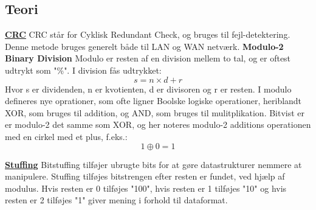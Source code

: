 \subsection{Teori}
\underline{\textbf{CRC}}
\newline
CRC står for Cyklisk Redundant Check, og bruges til fejl-detektering. Denne metode bruges generelt både til LAN og WAN netværk.
\newline
\textbf{Modulo-2 Binary Division}
\newline
Modulo er resten af en division mellem to tal, og er oftest udtrykt som "\%".
\newline
I division fås udtrykket:
$$s = n \times d + r$$
\newline
Hvor s er dividenden, n er kvotienten, d er divisoren og r er resten.
\newline
I modulo defineres nye oprationer, som ofte ligner Boolske logiske operationer, heriblandt XOR, som bruges til addition, og AND, som bruges til mulitplikation.
Bitvist er er modulo-2 det samme som XOR, og her noteres modulo-2 additions operationen med en cirkel med et plus, f.eks.: 
$$1 \oplus 0 = 1$$

\newline
\hfill \break
\underline{\textbf{Stuffing}}
\newline
Bitstuffing tilføjer ubrugte bits for at gøre datastrukturer nemmere at manipulere.
\newline
Stuffing tilføjes bitstrengen efter resten er fundet, ved hjælp af modulus. Hvis resten er 0 tilføjes "100", hvis resten er 1 tilføjes "10" og hvis resten er 2 tilføjes "1"
giver mening i forhold til dataformat.